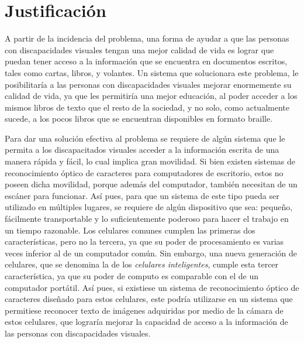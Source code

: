 \documentclass[a4paper, 11pt, oneside]{article}
\begin{document}
	\section{Justificación}
	A partir de la incidencia del problema, una forma de ayudar a que las personas con discapacidades visuales tengan una mejor calidad de vida es lograr que puedan tener acceso a la información que se encuentra en documentos escritos, tales como cartas, libros, y volantes. Un sistema que solucionara este problema, le posibilitaría a las personas con discapacidades visuales mejorar enormemente su calidad de vida, ya que les permitiría una mejor educación, al poder acceder a los mismos libros de texto que el resto de la sociedad, y no solo, como actualmente sucede, a los pocos libros que se encuentran disponibles en formato braille.

	Para dar una solución efectiva al problema se requiere de algún sistema que le permita a los discapacitados visuales acceder a la información escrita de una manera rápida y fácil, lo cual implica gran movilidad. Si bien existen sistemas de reconocimiento óptico de caracteres para computadores de escritorio, estos no poseen dicha movilidad, porque además del computador, también necesitan de un escáner para funcionar. Así pues, para que un sistema de este tipo pueda ser utilizado en múltiples lugares, se requiere de algún dispositivo que sea: pequeño, fácilmente transportable y lo suficientemente poderoso para hacer el trabajo en un tiempo razonable. Los celulares comunes cumplen las primeras dos características, pero no la tercera, ya que su poder de procesamiento es varias veces inferior al de un computador común. Sin embargo, una nueva generación de celulares, que se denomina la de los \textit{celulares inteligentes}, cumple esta tercer característica, ya que su poder de computo es comparable con el de un computador portátil. Así pues, si existiese un sistema de reconocimiento óptico de caracteres diseñado para estos celulares, este podría utilizarse en un sistema que permitiese reconocer texto de imágenes adquiridas por medio de la cámara de estos celulares, que lograría mejorar la capacidad de acceso a la información de las personas con discapacidades visuales.
\end{document}
